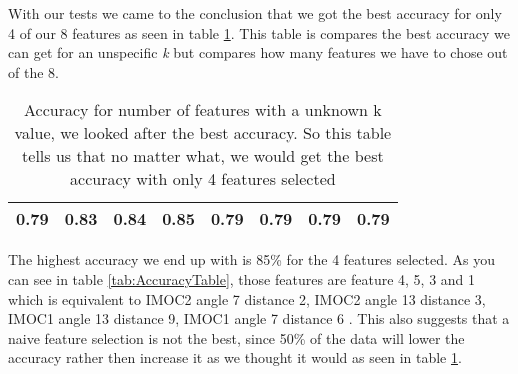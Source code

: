 With our tests we came to the conclusion that we got the best accuracy for only 4 of our 8 features as seen in table \ref{tab:numberOfFeatures}. This table is compares the best accuracy we can get for an unspecific \textit{k} but compares how many features we have to chose out of the 8.

\begin{table}[H]
  \centering
    \begin{tabular}{|c|c|c|c|c|c|c|c|}
    \hline
    0.79  & 0.83  & 0.84  & 0.85  & 0.79  & 0.79  & 0.79  & 0.79 \\
    \hline
    \end{tabular}%
  \caption{Accuracy for number of features with a unknown k value, we looked after the best accuracy. So this table tells us that no matter what, we would get the best accuracy with only 4 features selected}\label{tab:numberOfFeatures}%
\end{table}%

The highest accuracy we end up with is 85\% for the 4 features selected. As you can see in table \ref{tab:AccuracyTable}, those features are feature 4, 5, 3 and 1 which is equivalent to IMOC2 angle 7 distance 2, IMOC2 angle 13 distance 3, IMOC1 angle 13 distance 9, IMOC1 angle 7 distance 6 . This also suggests that a naive feature selection is not the best, since 50\% of the data will lower the accuracy rather then increase it as we thought it would as seen in table \ref{tab:numberOfFeatures}.

